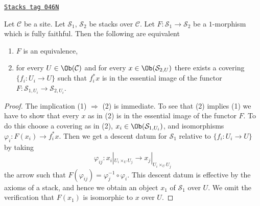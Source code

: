 \begin{lemma}
\label{stacks-lemma-characterize-essentially-surjective-when-ff}
\href{https://stacks.math.columbia.edu/tag/046N}{\texttt{Stacks tag 046N}}

Let $\mathcal{C}$ be a site.
Let $\mathcal{S}_1$, $\mathcal{S}_2$ be stacks over $\mathcal{C}$.
Let $F : \mathcal{S}_1 \to \mathcal{S}_2$ be a $1$-morphism which is
fully faithful. Then the following are equivalent
\begin{enumerate}
\item $F$ is an equivalence,
\item for every $U \in \Ob(\mathcal{C})$ and for every
$x \in \Ob(\mathcal{S}_{2, U})$ there exists a covering
$\{f_i : U_i \to U\}$ such that $f_i^*x$ is in the essential image
of the functor $F : \mathcal{S}_{1, U_i} \to \mathcal{S}_{2, U_i}$.
\end{enumerate}
\end{lemma}

\begin{proof}
The implication (1) $\Rightarrow$ (2) is immediate.
To see that (2) implies (1) we have to show that every
$x$ as in (2) is in the essential image of the functor $F$.
To do this choose a covering as in (2),
$x_i \in \Ob(\mathcal{S}_{1, U_i})$, and
isomorphisms $\varphi_i : F(x_i) \to f_i^*x$. Then we get a descent
datum for $\mathcal{S}_1$ relative to $\{f_i : U_i \to U\}$
by taking
$$
\varphi_{ij} :
x_i|_{U_i \times_U U_j}
\longrightarrow
x_j|_{U_i \times_U U_j}
$$
the arrow such that $F(\varphi_{ij}) = \varphi_j^{-1} \circ \varphi_i$.
This descent datum is effective by the axioms of a stack, and hence
we obtain an object $x_1$ of $\mathcal{S}_1$ over $U$. We omit the
verification that $F(x_1)$ is isomorphic to $x$ over $U$.
\end{proof}


